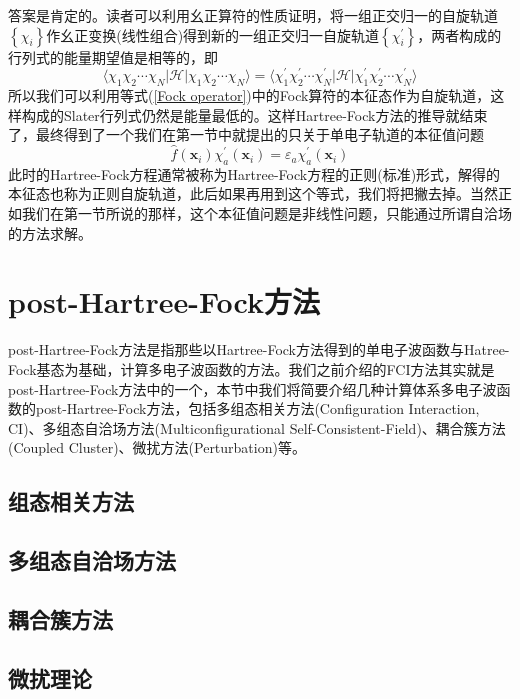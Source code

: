 \documentclass[12pt,a4paper,openany,twoside]{book}
\numberwithin{equation}{section}
\begin{document}
          答案是肯定的。读者可以利用幺正算符的性质证明，将一组正交归一的自旋轨道$\left\{\chi_i\right\}$作幺正变换(线性组合)得到新的一组正交归一自旋轨道$\left\{\chi_i^{\prime}\right\}$，两者构成的行列式的能量期望值是相等的，即
          \begin{equation}
            \langle\chi_1\chi_2\cdots\chi_N|\mathscr{H}|\chi_1\chi_2\cdots\chi_N\rangle = \langle\chi_1^{\prime}\chi_2^{\prime}\cdots\chi_N^{\prime}|\mathscr{H}|\chi_1^{\prime}\chi_2^{\prime}\cdots\chi_N^{\prime}\rangle
          \end{equation}
          所以我们可以利用等式(\ref{Fock operator})中的Fock算符的本征态作为自旋轨道，这样构成的Slater行列式仍然是能量最低的。这样Hartree-Fock方法的推导就结束了，最终得到了一个我们在第一节中就提出的只关于单电子轨道的本征值问题
          \begin{equation}
            \hat{f}(\mathbf{x}_i)\chi_a^{\prime}(\mathbf{x}_i) = \varepsilon_a\chi_a^{\prime}(\mathbf{x}_i)
          \end{equation}
          此时的Hartree-Fock方程通常被称为Hartree-Fock方程的正则(标准)形式，解得的本征态也称为正则自旋轨道，此后如果再用到这个等式，我们将把撇去掉。当然正如我们在第一节所说的那样，这个本征值问题是非线性问题，只能通过所谓自洽场的方法求解。

      \section{post-Hartree-Fock方法}
        post-Hartree-Fock方法是指那些以Hartree-Fock方法得到的单电子波函数与Hatree-Fock基态为基础，计算多电子波函数的方法。我们之前介绍的FCI方法其实就是post-Hartree-Fock方法中的一个，本节中我们将简要介绍几种计算体系多电子波函数的post-Hartree-Fock方法，包括多组态相关方法(Configuration Interaction, CI)、多组态自洽场方法(Multiconfigurational Self-Consistent-Field)、耦合簇方法(Coupled Cluster)、微扰方法(Perturbation)等。
        \subsection{组态相关方法}
        \subsection{多组态自洽场方法}
        \subsection{耦合簇方法}
        \subsection{微扰理论}
\end{document}
